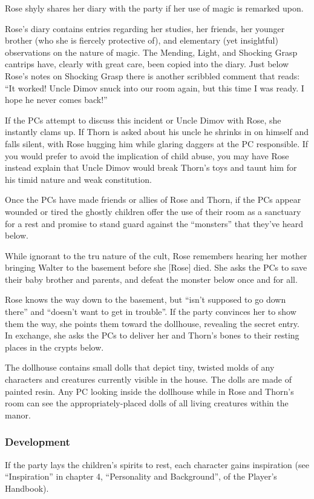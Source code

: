 Rose shyly shares her diary with the party if her use of magic is remarked upon.
\begin{readout}
  Rose's diary contains entries regarding her studies, her friends, her younger brother (who she is fiercely
  protective of), and elementary (yet insightful) observations on the nature of magic. The Mending, Light, and
  Shocking Grasp cantrips have, clearly with great care, been copied into the diary. Just below Rose's notes
  on Shocking Grasp there is another scribbled comment that reads: ``It worked! Uncle Dimov snuck into our room
  again, but this time I was ready. I hope he never comes back!''
\end{readout}
If the PCs attempt to discuss this incident or Uncle Dimov with Rose, she instantly clams up. If Thorn is
asked about his uncle he shrinks in on himself and falls silent, with Rose hugging him while glaring daggers
at the PC responsible. If you would prefer to avoid the implication of child abuse, you may have Rose instead
explain that Uncle Dimov would break Thorn's toys and taunt him for his timid nature and weak constitution.

Once the PCs have made friends or allies of Rose and Thorn, if the PCs appear wounded or tired the ghostly
children offer the use of their room as a sanctuary for a rest and promise to stand guard against the
``monsters'' that they've heard below.

While ignorant to the tru nature of the cult, Rose remembers hearing her mother bringing Walter to the
basement before she [Rose] died. She asks the PCs to save their baby brother and parents, and defeat the
monster below once and for all.

Rose knows the way down to the basement, but ``isn't supposed to go down there'' and ``doesn't want to
get in trouble''. If the party convinces her to show them the way, she points them toward the dollhouse,
revealing the secret entry. In exchange, she asks the PCs to deliver her and Thorn's bones to their
resting places in the crypts below.

The dollhouse contains small dolls that depict tiny, twisted molds of any characters and creatures currently
visible in the house. The dolls are made of painted resin. Any PC looking inside the dollhouse while in Rose
and Thorn's room can see the appropriately-placed dolls of all living creatures within the manor.

\subsubsection*{Development}
If the party lays the children's spirits to rest, each character gains inspiration (see ``Inspiration'' in
chapter 4, ``Personality and Background'', of the Player's Handbook).

